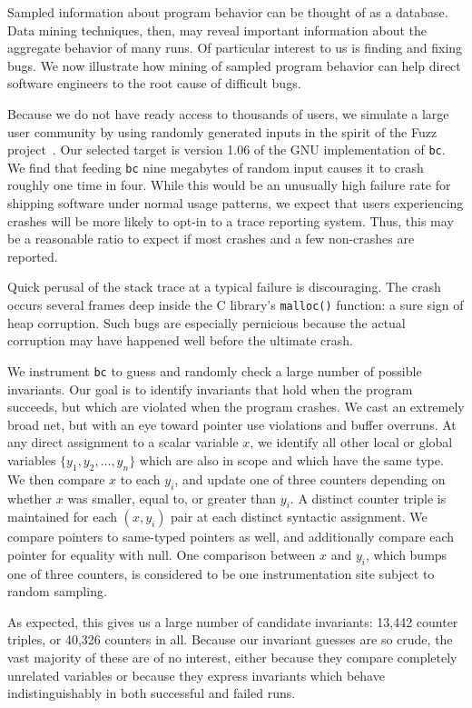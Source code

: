 Sampled information about program behavior can be thought of as a
database.  Data mining techniques, then, may reveal important
information about the aggregate behavior of many runs.  Of particular
interest to us is finding and fixing bugs.  We now illustrate how
mining of sampled program behavior can help direct software engineers
to the root cause of difficult bugs.

Because we do not have ready access to thousands of users, we simulate
a large user community by using randomly generated inputs in the
spirit of the Fuzz project~\cite{MKLMMNS95}.  Our selected target is
version 1.06 of the GNU implementation of \texttt{bc}.  We find that
feeding \texttt{bc} nine megabytes of random input causes it to crash
roughly one time in four.  While this would be an unusually high
failure rate for shipping software under normal usage patterns, we
expect that users experiencing crashes will be more likely to opt-in
to a trace reporting system.  Thus, this may be a reasonable ratio to
expect if most crashes and a few non-crashes are reported.

Quick perusal of the stack trace at a typical failure is discouraging.
The crash occurs several frames deep inside the C library's
\texttt{malloc()} function: a sure sign of heap corruption.  Such bugs
are especially pernicious because the actual corruption may have
happened well before the ultimate crash.  

We instrument \texttt{bc} to guess and randomly check a large number
of possible invariants.  Our goal is to identify invariants that hold
when the program succeeds, but which are violated when the program
crashes.  We cast an extremely broad net, but with an eye toward
pointer use violations and buffer overruns.  At any direct assignment
to a scalar variable $x$, we identify all other local or global
variables $\{ y_1, y_2, \dots, y_n \}$ which are also in scope and
which have the same type.  We then compare $x$ to each $y_i$, and
update one of three counters depending on whether $x$ was smaller,
equal to, or greater than $y_i$.  A distinct counter triple is
maintained for each $(x, y_i)$ pair at each distinct syntactic
assignment.  We compare pointers to same-typed pointers as well, and
additionally compare each pointer for equality with null.  One
comparison between $x$ and $y_i$, which bumps one of three counters,
is considered to be one instrumentation site subject to random
sampling.

As expected, this gives us a large number of candidate invariants:
13,442 counter triples, or 40,326 counters in all.  Because our
invariant guesses are so crude, the vast majority of these are of no
interest, either because they compare completely unrelated variables
or because they express invariants which behave indistinguishably in
both successful and failed runs.


